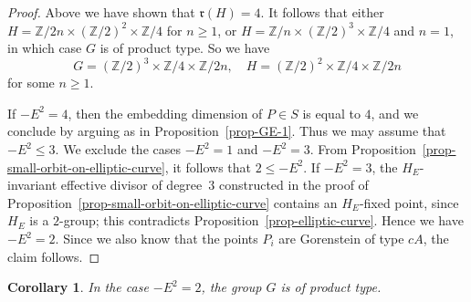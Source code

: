 \documentclass[11pt]{amsart}
\numberwithin{equation}{section}
\newtheorem{corollary}[thm]{Corollary}
\theoremstyle{definition}
\theoremstyle{remark}
\begin{document}
\begin{proof}
Above we have shown that $\mathfrak{r}(H)=4$. It follows that either $H=\mathbb{Z}/2n\times(\mathbb{Z}/2)^2\times \mathbb{Z}/4$ for $n\geq 1$, or $H=\mathbb{Z}/n\times (\mathbb{Z}/2)^3\times \mathbb{Z}/4$ and $n=1$, in which case $G$ is of product type. So we have 
\[
G=(\mathbb{Z}/2)^3\times \mathbb{Z}/4 \times \mathbb{Z}/2n, \quad H=(\mathbb{Z}/2)^2\times \mathbb{Z}/4\times \mathbb{Z}/2n
\] 
for some $n\geq 1$. 

If $-E^2= 4$, then the embedding dimension of $P\in S$ is equal to $4$, and we conclude by arguing as in Proposition~\ref{prop-GE-1}. Thus we may assume that $-E^2\leq3$. We exclude the cases $-E^2=1$ and $-E^2=3$.
From Proposition~\ref{prop-small-orbit-on-elliptic-curve}, it follows that $2\leq -E^2$. 
If $-E^2=3$, the $H_E$-invariant effective divisor of degree~$3$ constructed in the proof of Proposition~\ref{prop-small-orbit-on-elliptic-curve} contains an $H_E$-fixed point, since $H_E$ is a $2$-group; this contradicts Proposition~\ref{prop-elliptic-curve}. Hence we have $-E^2=2$. 
Since we also know that the points $P_i$ are Gorenstein of type $cA$, the claim follows.  
\end{proof}

\begin{corollary}
\label{cor-GE-3}
In the case $-E^2=2$, the group $G$ is of product type. 
\end{corollary}
\end{document}
